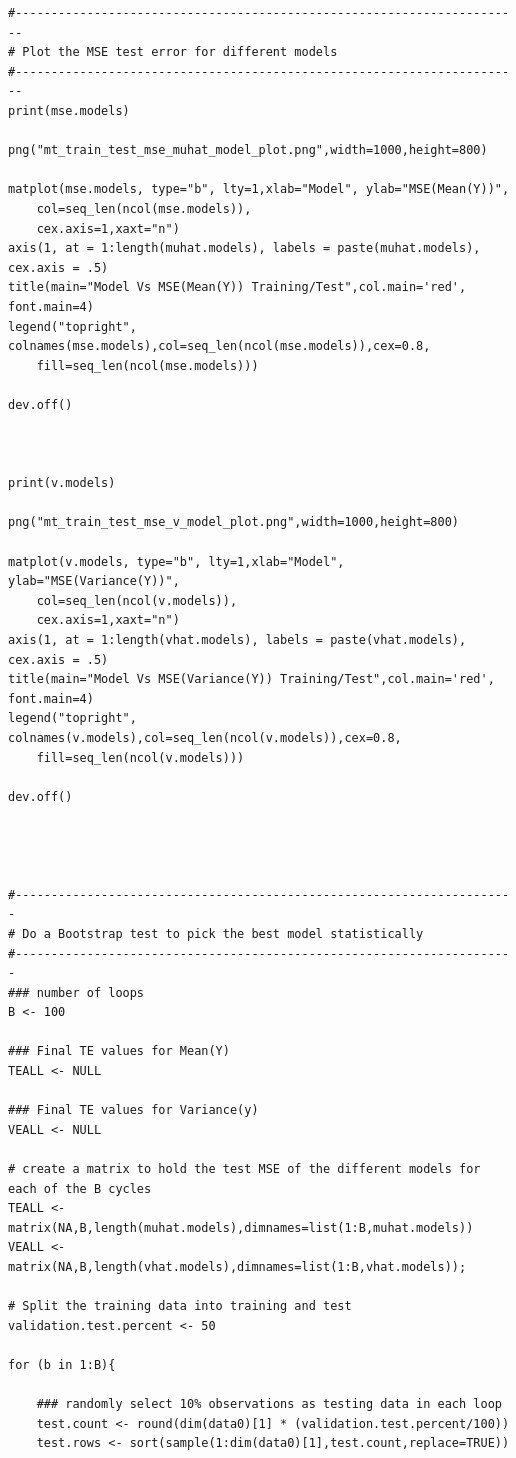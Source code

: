 \documentclass[twoside,12pt]{article}
\begin{document}
\begin{verbatim}
#-----------------------------------------------------------------------
# Plot the MSE test error for different models
#-----------------------------------------------------------------------
print(mse.models)

png("mt_train_test_mse_muhat_model_plot.png",width=1000,height=800)

matplot(mse.models, type="b", lty=1,xlab="Model", ylab="MSE(Mean(Y))",
	col=seq_len(ncol(mse.models)),
	cex.axis=1,xaxt="n")
axis(1, at = 1:length(muhat.models), labels = paste(muhat.models), cex.axis = .5)
title(main="Model Vs MSE(Mean(Y)) Training/Test",col.main='red', font.main=4)
legend("topright", colnames(mse.models),col=seq_len(ncol(mse.models)),cex=0.8,
	fill=seq_len(ncol(mse.models)))

dev.off()



print(v.models)

png("mt_train_test_mse_v_model_plot.png",width=1000,height=800)

matplot(v.models, type="b", lty=1,xlab="Model", ylab="MSE(Variance(Y))",
	col=seq_len(ncol(v.models)),
	cex.axis=1,xaxt="n")
axis(1, at = 1:length(vhat.models), labels = paste(vhat.models), cex.axis = .5)
title(main="Model Vs MSE(Variance(Y)) Training/Test",col.main='red', font.main=4)
legend("topright", colnames(v.models),col=seq_len(ncol(v.models)),cex=0.8,
	fill=seq_len(ncol(v.models)))

dev.off()




#----------------------------------------------------------------------
# Do a Bootstrap test to pick the best model statistically
#----------------------------------------------------------------------
### number of loops
B <- 100

### Final TE values for Mean(Y)
TEALL <- NULL

### Final TE values for Variance(y)
VEALL <- NULL

# create a matrix to hold the test MSE of the different models for each of the B cycles
TEALL <- matrix(NA,B,length(muhat.models),dimnames=list(1:B,muhat.models))
VEALL <- matrix(NA,B,length(vhat.models),dimnames=list(1:B,vhat.models));

# Split the training data into training and test
validation.test.percent <- 50

for (b in 1:B){

	### randomly select 10% observations as testing data in each loop
	test.count <- round(dim(data0)[1] * (validation.test.percent/100))
	test.rows <- sort(sample(1:dim(data0)[1],test.count,replace=TRUE))


\end{verbatim}
\end{document}
